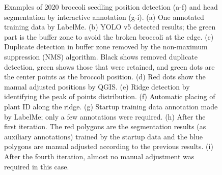 \begin{figure}[htb]
  \begin{center}
  \end{center}
  \caption[Examples of 2020 broccoli seedling position detection (a-f) and head segmentation by interactive annotation (g-i)]{
    Examples of 2020 broccoli seedling position detection (a-f) and head segmentation by interactive annotation (g-i). 
    (a) One annotated training data by LabelMe. 
    (b) YOLO v5 detected results; the green part is the buffer zone to avoid the broken broccoli at the edge. 
    (c) Duplicate detection in buffer zone removed by the non-maximum suppression (NMS) algorithm. Black shows removed duplicate detection, green shows those that were retained, and green dots are the center points as the broccoli position. 
    (d) Red dots show the manual adjusted positions by QGIS. 
    (e) Ridge detection by identifying the peak of points distribution. 
    (f) Automatic placing of plant ID along the ridge. 
    (g) Startup training data annotation made by LabelMe; only a few annotations were required. 
    (h) After the first iteration. The red polygons are the segmentation results (as auxiliary annotations) trained by the startup data and the blue polygons are manual adjusted according to the previous results. 
    (i) After the fourth iteration, almost no manual adjustment was required in this case.
  }
  \label{fig:cp4s1}
\end{figure}